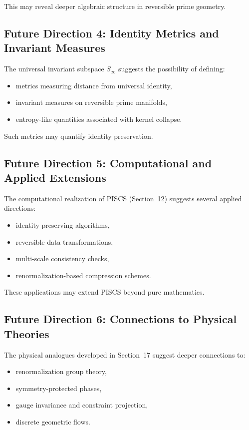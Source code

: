 \documentclass[11pt]{article}
\theoremstyle{definition}
\theoremstyle{plain}
\theoremstyle{remark}
\begin{document}
This may reveal deeper algebraic structure in reversible prime geometry.

\subsection{Future Direction 4: Identity Metrics and Invariant Measures}

The universal invariant subspace $S_\infty$ suggests the possibility of
defining:

\begin{itemize}
    \item metrics measuring distance from universal identity,
    \item invariant measures on reversible prime manifolds,
    \item entropy-like quantities associated with kernel collapse.
\end{itemize}

Such metrics may quantify identity preservation.

\subsection{Future Direction 5: Computational and Applied Extensions}

The computational realization of PISCS (Section~12) suggests several
applied directions:

\begin{itemize}
    \item identity-preserving algorithms,
    \item reversible data transformations,
    \item multi-scale consistency checks,
    \item renormalization-based compression schemes.
\end{itemize}

These applications may extend PISCS beyond pure mathematics.

\subsection{Future Direction 6: Connections to Physical Theories}

The physical analogues developed in Section~17 suggest deeper
connections to:

\begin{itemize}
    \item renormalization group theory,
    \item symmetry-protected phases,
    \item gauge invariance and constraint projection,
    \item discrete geometric flows.
\end{itemize}
\end{document}
